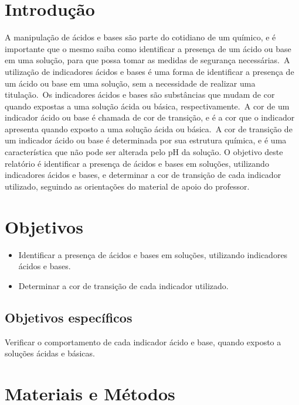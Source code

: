 \documentclass[a4paper, 11pt]{article}
\begin{document}
\newpage
\section{Introdução}\label{sec:intro}
    \indent A manipulação de ácidos e bases são parte do cotidiano de um químico, e é importante que o mesmo saiba como identificar a presença de um ácido ou base em uma solução, para que possa tomar as medidas de segurança necessárias.\  A utilização de indicadores ácidos e bases é uma forma de identificar a presença de um ácido ou base em uma solução, sem a necessidade de realizar uma titulação.\  Os indicadores ácidos e bases são substâncias que mudam de cor quando expostas a uma solução ácida ou básica, respectivamente.\  A cor de um indicador ácido ou base é chamada de cor de transição, e é a cor que o indicador apresenta quando exposto a uma solução ácida ou básica.\  A cor de transição de um indicador ácido ou base é determinada por sua estrutura química, e é uma característica que não pode ser alterada pelo pH da solução.
    \indent O objetivo deste relatório é identificar a presença de ácidos e bases em soluções, utilizando indicadores ácidos e bases, e determinar a cor de transição de cada indicador utilizado, seguindo as orientações do material de apoio do professor.

\section{Objetivos}\label{sec:objetivos}
    \begin{itemize}
        \item Identificar a presença de ácidos e bases em soluções, utilizando indicadores ácidos e bases.
        \item Determinar a cor de transição de cada indicador utilizado.
    \end{itemize}
    \subsection{Objetivos específicos}\label{sec:objetivos_especificos}
    \indent Verificar o comportamento de cada indicador ácido e base, quando exposto a soluções ácidas e básicas.


\section{Materiais e Métodos}\label{sec:mat}
\end{document}
